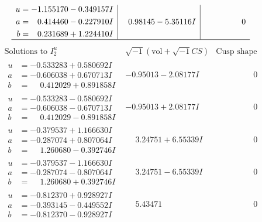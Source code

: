 \documentclass[1p]{elsarticle_modified}
\theoremstyle{definition}
\newcommand{\I}{\sqrt{-1}}
\begin{document}
$$\begin{array}{c|c|c}
\begin{aligned}
u &= -1.155170 - 0.349157 I \\
a &= \phantom{-}0.414460 - 0.227910 I \\
b &= \phantom{-}0.231689 + 1.224410 I\end{aligned}
 & \phantom{-}0.98145 - 5.35116 I & \phantom{-0.000000 } 0\\
 \hline 
 \end{array}$$\newpage$$\begin{array}{c|c|c}  
\text{Solutions to }I^u_{2}& \I (\text{vol} + \sqrt{-1}CS) & \text{Cusp shape}\\
 \hline 
\begin{aligned}
u &= -0.533283 + 0.580692 I \\
a &= -0.606038 + 0.670713 I \\
b &= \phantom{-}0.412029 + 0.891858 I\end{aligned}
 & -0.95013 - 2.08177 I & \phantom{-0.000000 } 0 \\ \hline\begin{aligned}
u &= -0.533283 - 0.580692 I \\
a &= -0.606038 - 0.670713 I \\
b &= \phantom{-}0.412029 - 0.891858 I\end{aligned}
 & -0.95013 + 2.08177 I & \phantom{-0.000000 } 0 \\ \hline\begin{aligned}
u &= -0.379537 + 1.166630 I \\
a &= -0.287074 + 0.807064 I \\
b &= \phantom{-}1.260680 - 0.392746 I\end{aligned}
 & \phantom{-}3.24751 + 6.55339 I & \phantom{-0.000000 } 0 \\ \hline\begin{aligned}
u &= -0.379537 - 1.166630 I \\
a &= -0.287074 - 0.807064 I \\
b &= \phantom{-}1.260680 + 0.392746 I\end{aligned}
 & \phantom{-}3.24751 - 6.55339 I & \phantom{-0.000000 } 0 \\ \hline\begin{aligned}
u &= -0.812370 + 0.928927 I \\
a &= -0.393145 - 0.449552 I \\
b &= -0.812370 - 0.928927 I\end{aligned}
 & \phantom{-}5.43471\phantom{ +0.000000I} & \phantom{-0.000000 } 0 \\ \hline\begin{aligned}

\end{aligned}
\end{array}$$
\end{document}
